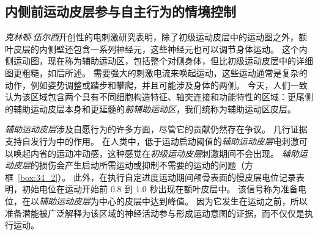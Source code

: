 \subsection{内侧前运动皮层参与自主行为的情境控制}

\textit{克林顿$\cdot$伍尔西}开创性的电刺激研究表明，除了初级运动皮层中的运动图之外，额叶皮层的内侧壁还包含一系列神经元，这些神经元也可以调节身体运动。
这个内侧运动图，现在称为辅助运动区，包括整个对侧身体，但比初级运动皮层中的详细图更粗糙，如后所述。
需要强大的刺激电流来唤起运动，这些运动通常是复杂的动作，例如姿势调整或踏步和攀爬，并且可能涉及身体的两侧。
今天，人们一致认为该区域包含两个具有不同细胞构造特征、轴突连接和功能特性的区域：更尾侧的辅助运动皮层本身和更延髓的\textit{前辅助运动区}，我们统称为辅助运动区皮层。


\textit{辅助运动皮层}涉及自愿行为的许多方面，尽管它的贡献仍然存在争议。
几行证据支持自发行为中的作用。
在人类中，低于运动启动阈值的\textit{辅助运动皮层}电刺激可以唤起内省的运动冲动感，这种感觉在\textit{初级运动皮层}刺激期间不会出现。
\textit{辅助运动皮层}的损伤会产生启动所需运动或抑制不需要的运动的问题（方框~\ref{box:34_2}）。
此外，在执行自定进度运动期间颅骨表面的慢皮层电位记录表明，初始电位在运动开始前 0.8 到 1.0 秒出现在额叶皮层中。
该信号称为准备电位，在以\textit{辅助运动皮层}为中心的皮层中达到峰值。
因为它发生在运动之前，所以准备潜能被广泛解释为该区域的神经活动参与形成运动意图的证据，而不仅仅是执行运动。



